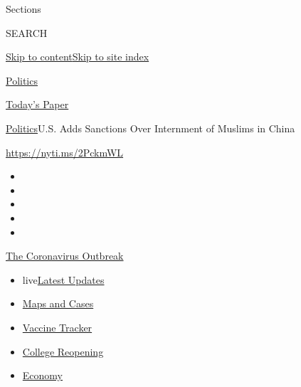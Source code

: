 Sections

SEARCH

\protect\hyperlink{site-content}{Skip to
content}\protect\hyperlink{site-index}{Skip to site index}

\href{https://www.nytimes3xbfgragh.onion/section/politics}{Politics}

\href{https://myaccount.nytimes3xbfgragh.onion/auth/login?response_type=cookie\&client_id=vi}{}

\href{https://www.nytimes3xbfgragh.onion/section/todayspaper}{Today's
Paper}

\href{/section/politics}{Politics}\textbar{}U.S. Adds Sanctions Over
Internment of Muslims in China

\href{https://nyti.ms/2PckmWL}{https://nyti.ms/2PckmWL}

\begin{itemize}
\item
\item
\item
\item
\item
\end{itemize}

\href{https://www.nytimes3xbfgragh.onion/news-event/coronavirus?action=click\&pgtype=Article\&state=default\&region=TOP_BANNER\&context=storylines_menu}{The
Coronavirus Outbreak}

\begin{itemize}
\tightlist
\item
  live\href{https://www.nytimes3xbfgragh.onion/2020/08/03/world/coronavirus-covid-19.html?action=click\&pgtype=Article\&state=default\&region=TOP_BANNER\&context=storylines_menu}{Latest
  Updates}
\item
  \href{https://www.nytimes3xbfgragh.onion/interactive/2020/us/coronavirus-us-cases.html?action=click\&pgtype=Article\&state=default\&region=TOP_BANNER\&context=storylines_menu}{Maps
  and Cases}
\item
  \href{https://www.nytimes3xbfgragh.onion/interactive/2020/science/coronavirus-vaccine-tracker.html?action=click\&pgtype=Article\&state=default\&region=TOP_BANNER\&context=storylines_menu}{Vaccine
  Tracker}
\item
  \href{https://www.nytimes3xbfgragh.onion/2020/08/02/us/covid-college-reopening.html?action=click\&pgtype=Article\&state=default\&region=TOP_BANNER\&context=storylines_menu}{College
  Reopening}
\item
  \href{https://www.nytimes3xbfgragh.onion/live/2020/08/03/business/stock-market-today-coronavirus?action=click\&pgtype=Article\&state=default\&region=TOP_BANNER\&context=storylines_menu}{Economy}
\end{itemize}

